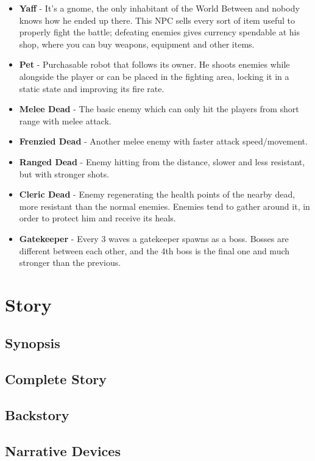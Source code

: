 \documentclass[12pt]{article}
\begin{document}
\begin{itemize}
	\item \textbf{Yaff} - It’s a gnome, the only inhabitant of the World Between and nobody knows how he ended up there. This NPC sells every sort of item useful to properly fight the battle; defeating enemies gives currency spendable at his shop, where you can buy weapons, equipment and other items.
	\item \textbf{Pet} - Purchasable robot that follows its owner. He shoots enemies while alongside the player or can be placed in the fighting area, locking it in a static state and improving its fire rate.
	\item \textbf{Melee Dead} - The basic enemy which can only hit the players from short range with melee attack.
	\item \textbf{Frenzied Dead} - Another melee enemy with faster attack speed/movement.
	\item \textbf{Ranged Dead} - Enemy hitting from the distance, slower and less resistant, but with stronger shots.
	\item \textbf{Cleric Dead} - Enemy regenerating the health points of the nearby dead, more resistant than the normal enemies. Enemies tend to gather around it, in order to protect him and receive its heals.
	\item \textbf{Gatekeeper} - Every 3 waves a gatekeeper spawns as a boss. Bosses are different between each other, and the 4th boss is the final one and much stronger than the previous.
\end{itemize}

\newpage

\section{Story}

\subsection{Synopsis}

\subsection{Complete Story}

\subsection{Backstory}

\subsection{Narrative Devices}
\end{document}
